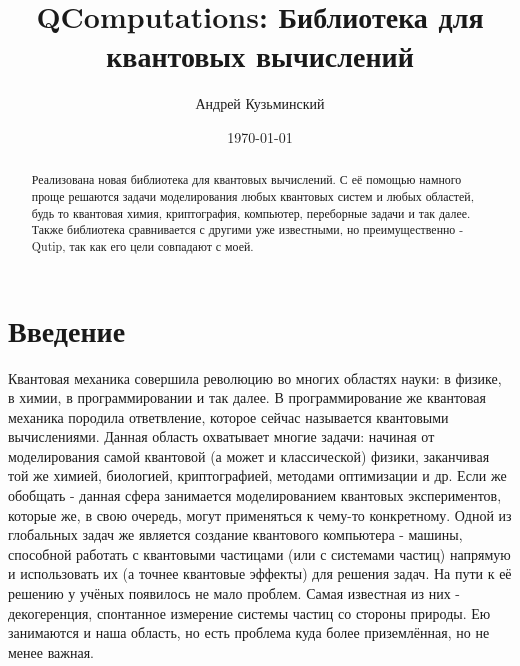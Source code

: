 \documentclass[aps,twocolumn,pra,showpacs,amsmath,amssymb,showkeys,10pt]{revtex4-2}
\begin{document}
    

\title{QComputations: Библиотека для квантовых вычислений}
	
\author{Андрей Кузьминский}

\begin{abstract}
Реализована новая библиотека для квантовых вычислений. С её помощью намного проще решаются задачи моделирования любых квантовых систем и любых областей, будь то квантовая химия, криптография, компьютер, 
переборные задачи и так далее. Также библиотека сравнивается с другими уже известными, но преимущественно - Qutip, так как его цели совпадают с моей. 
\end{abstract}


\date[]{ \today}

\maketitle

    \section{Введение}
        Квантовая механика совершила революцию во многих областях науки: в физике, в химии, в программировании и так далее. В программирование же квантовая механика породила ответвление,
         которое сейчас называется квантовыми вычислениями. Данная область охватывает многие задачи: начиная от моделирования самой квантовой (а может и классической) физики,
         заканчивая той же химией, биологией, криптографией, методами оптимизации и др. Если же обобщать - данная сфера занимается моделированием квантовых экспериментов, которые же, в свою очередь,
        могут применяться к чему-то конкретному. Одной из глобальных задач же является создание квантового компьютера - машины, способной работать с квантовыми частицами (или с системами частиц) 
        напрямую и использовать их (а точнее квантовые эффекты) для решения задач. На пути к её решению у учёных появилось не мало проблем. Самая известная из них - 
        декогеренция, спонтанное измерение системы частиц со стороны природы. Ею занимаются и наша область, но есть проблема куда более приземлённая, но не менее важная.
            
\end{document}
